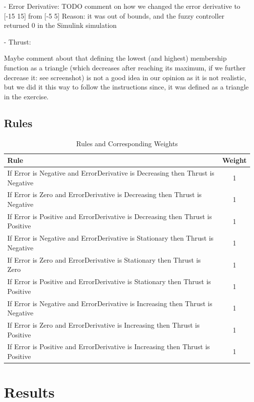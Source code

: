 \documentclass[11pt]{article}
\begin{document}
- Error Derivative: 
TODO comment on how we changed the error derivative to [-15 15] from [-5 5]
Reason: it was out of bounds, and the fuzzy controller returned 0 in the Simulink simulation

- Thrust: 

Maybe comment about that defining the lowest (and highest) membership function as a triangle (which decreases after reaching its maximum, if we further decrease it: see screenshot) is not a good idea in our opinion as it is not realistic, but we did it this way to follow the instructions since, it was defined as a triangle in the exercise.

\subsection{Rules}

\begin{table}[h!]
    \centering
    \begin{tabular}{@{}>{\raggedright\arraybackslash}p{12cm}c@{}}
    \toprule
    \textbf{Rule} & \textbf{Weight} \\ \midrule
    If Error is Negative and ErrorDerivative is Decreasing then Thrust is Negative & 1 \\
    If Error is Zero and ErrorDerivative is Decreasing then Thrust is Negative & 1 \\
    If Error is Positive and ErrorDerivative is Decreasing then Thrust is Positive & 1 \\
    If Error is Negative and ErrorDerivative is Stationary then Thrust is Negative & 1 \\
    If Error is Zero and ErrorDerivative is Stationary then Thrust is Zero & 1 \\
    If Error is Positive and ErrorDerivative is Stationary then Thrust is Positive & 1 \\
    If Error is Negative and ErrorDerivative is Increasing then Thrust is Negative & 1 \\
    If Error is Zero and ErrorDerivative is Increasing then Thrust is Positive & 1 \\
    If Error is Positive and ErrorDerivative is Increasing then Thrust is Positive & 1 \\ \bottomrule
    \end{tabular}
    \caption{Rules and Corresponding Weights}
    \label{tab:rules}
    \end{table}
    

\section{Results}
\end{document}
